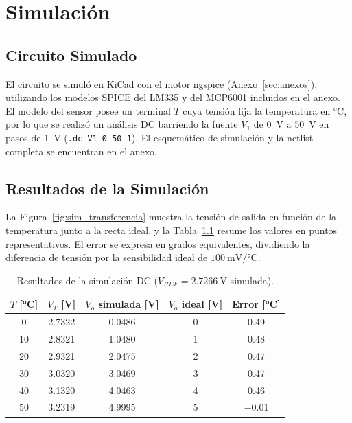 \chapter{Simulación}
\label{sec:simulacion}

\section{Circuito Simulado}

El circuito se simuló en KiCad con el motor ngspice (Anexo~\ref{sec:anexos}), utilizando los modelos
SPICE del LM335 y del MCP6001 incluidos en el anexo. El modelo del sensor posee un terminal $T$ cuya tensión
fija la temperatura en \si{\celsius}, por lo que se realizó un análisis DC barriendo la fuente $V_1$ de \SI{0}{\volt}
a \SI{50}{\volt} en pasos de \SI{1}{\volt} (\texttt{.dc V1 0 50 1}). El esquemático de simulación y la netlist completa se
encuentran en el anexo.

\section{Resultados de la Simulación}

La Figura~\ref{fig:sim_transferencia} muestra la tensión de salida en función de la temperatura junto a la recta
ideal, y la Tabla~\ref{tab:sim} resume los valores en puntos representativos. El error se expresa en grados
equivalentes, dividiendo la diferencia de tensión por la sensibilidad ideal de $\SI{100}{\milli\volt/\celsius}$.


\begin{table}[!ht]
  \centering
  \small
  \renewcommand{\arraystretch}{1.15}
  \begin{tabular}{|c|c|c|c|c|}
    \hline
    $T$ [\unit{\celsius}] & $V_T$ [\unit{\volt}] & $V_o$ simulada [\unit{\volt}] & $V_o$ ideal [\unit{\volt}]
      & Error [\unit{\celsius}] \\
    \hline
    \num{0} & \num{2.7322} & \num{0.0486} & \num{0} & \num{0.49} \\
    \num{10} & \num{2.8321} & \num{1.0480} & \num{1} & \num{0.48} \\
    \num{20} & \num{2.9321} & \num{2.0475} & \num{2} & \num{0.47} \\
    \num{30} & \num{3.0320} & \num{3.0469} & \num{3} & \num{0.47} \\
    \num{40} & \num{3.1320} & \num{4.0463} & \num{4} & \num{0.46} \\
    \num{50} & \num{3.2319} & \num{4.9995} & \num{5} & \num{-0.01} \\
    \hline
  \end{tabular}
  \caption{Resultados de la simulación DC ($V_{REF} = \SI{2.7266}{\volt}$ simulada).}
  \label{tab:sim}
\end{table}


